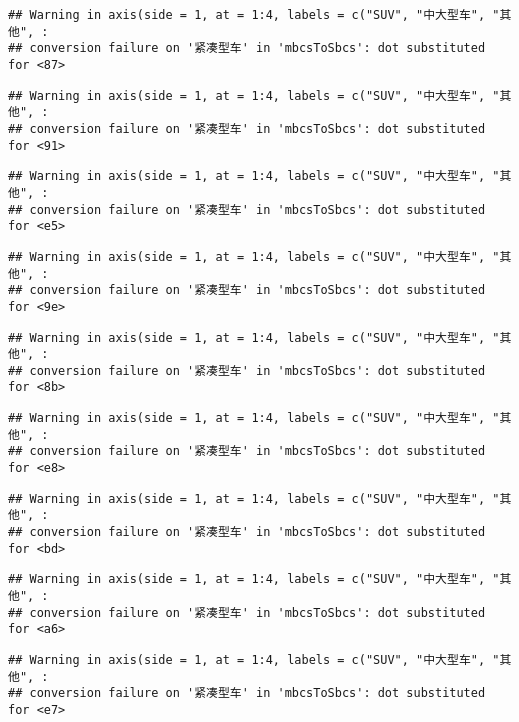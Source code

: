 \documentclass[]{article}
\begin{document}
\begin{verbatim}
## Warning in axis(side = 1, at = 1:4, labels = c("SUV", "中大型车", "其他", :
## conversion failure on '紧凑型车' in 'mbcsToSbcs': dot substituted for <87>
\end{verbatim}

\begin{verbatim}
## Warning in axis(side = 1, at = 1:4, labels = c("SUV", "中大型车", "其他", :
## conversion failure on '紧凑型车' in 'mbcsToSbcs': dot substituted for <91>
\end{verbatim}

\begin{verbatim}
## Warning in axis(side = 1, at = 1:4, labels = c("SUV", "中大型车", "其他", :
## conversion failure on '紧凑型车' in 'mbcsToSbcs': dot substituted for <e5>
\end{verbatim}

\begin{verbatim}
## Warning in axis(side = 1, at = 1:4, labels = c("SUV", "中大型车", "其他", :
## conversion failure on '紧凑型车' in 'mbcsToSbcs': dot substituted for <9e>
\end{verbatim}

\begin{verbatim}
## Warning in axis(side = 1, at = 1:4, labels = c("SUV", "中大型车", "其他", :
## conversion failure on '紧凑型车' in 'mbcsToSbcs': dot substituted for <8b>
\end{verbatim}

\begin{verbatim}
## Warning in axis(side = 1, at = 1:4, labels = c("SUV", "中大型车", "其他", :
## conversion failure on '紧凑型车' in 'mbcsToSbcs': dot substituted for <e8>
\end{verbatim}

\begin{verbatim}
## Warning in axis(side = 1, at = 1:4, labels = c("SUV", "中大型车", "其他", :
## conversion failure on '紧凑型车' in 'mbcsToSbcs': dot substituted for <bd>
\end{verbatim}

\begin{verbatim}
## Warning in axis(side = 1, at = 1:4, labels = c("SUV", "中大型车", "其他", :
## conversion failure on '紧凑型车' in 'mbcsToSbcs': dot substituted for <a6>
\end{verbatim}

\begin{verbatim}
## Warning in axis(side = 1, at = 1:4, labels = c("SUV", "中大型车", "其他", :
## conversion failure on '紧凑型车' in 'mbcsToSbcs': dot substituted for <e7>
\end{verbatim}
\end{document}
